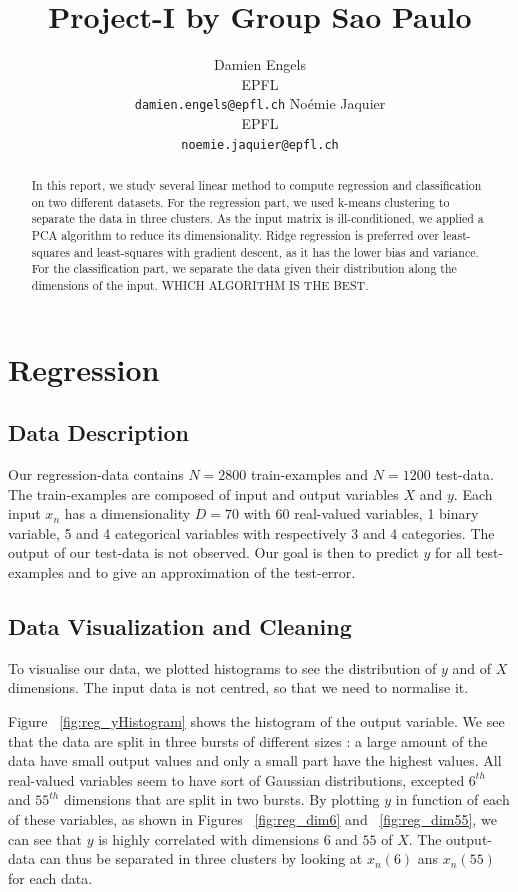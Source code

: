 \documentclass{article} %
\title{Project-I by Group Sao Paulo}
\author{
Damien Engels\\
EPFL \\
\texttt{damien.engels@epfl.ch} \And No\'emie Jaquier\\
EPFL \\
\texttt{noemie.jaquier@epfl.ch} \\
}
\begin{document}
\maketitle

\begin{abstract}
In this report, we study several linear method to compute regression and classification on two different datasets. For the regression part, we used k-means clustering to separate the data in three clusters. As the input matrix is ill-conditioned, we applied a PCA algorithm to reduce its dimensionality. Ridge regression is preferred over least-squares and least-squares with gradient descent, as it has the lower bias and variance. For the classification part, we separate the data given their distribution along the dimensions of the input. WHICH ALGORITHM IS THE BEST.
\end{abstract}

\section{Regression}
\subsection{Data Description}
Our regression-data contains $N=2800$ train-examples and $N=1200$ test-data. The
train-examples are composed of input and output variables $X$ and $y$. Each
input $x_n$ has a dimensionality $D=70$ with 60 real-valued variables, 1 binary
variable, 5 and 4 categorical variables with respectively 3 and 4 categories.
The output of our test-data is not observed. Our goal is then to predict $y$ for
all test-examples and to give an approximation of the test-error.

\subsection{Data Visualization and Cleaning}
To visualise our data, we plotted histograms to see the distribution of $y$ and
of $X$ dimensions. The input data is not centred, so that we need to normalise
it. 

Figure ~\ref{fig:reg_yHistogram} shows the histogram of the output variable. We
see that the data are split in three bursts of different sizes : a large amount
of the data have small output values and only a small part have the highest
values. All real-valued variables seem to have sort of Gaussian distributions,
excepted $6^{th}$ and $55^{th}$ dimensions that are split in two bursts. By
plotting $y$ in function of each of these variables, as shown in Figures
~\ref{fig:reg_dim6} and ~\ref{fig:reg_dim55}, we can see that $y$ is highly
correlated with dimensions $6$ and $55$ of $X$. The output-data can thus be
separated in three clusters by looking at $x_n(6)$ ans $x_n(55)$ for each data.
\end{document}
